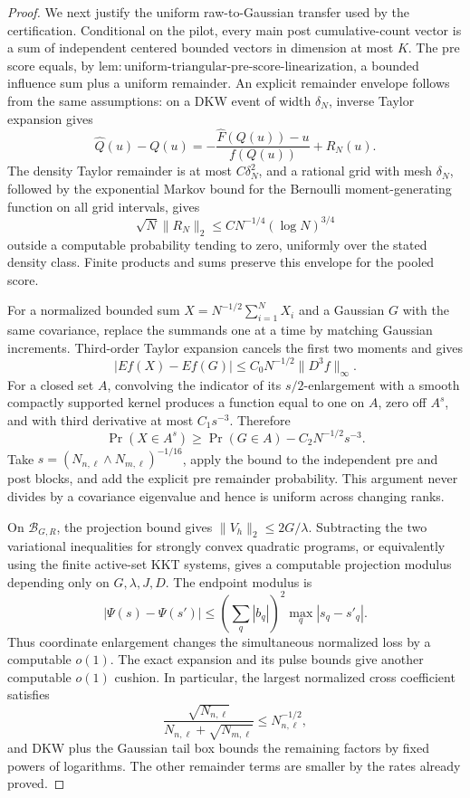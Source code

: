 \documentclass{article}
\begin{document}
\begin{proof}
We next justify the uniform raw-to-Gaussian transfer used by the certification.  Conditional on the pilot, every main post cumulative-count vector is a sum of independent centered bounded vectors in dimension at most \(K\).  The pre score equals, by
\(\mathrm{lem:uniform\mbox{-}triangular\mbox{-}pre\mbox{-}score\mbox{-}linearization}\), a bounded influence sum plus a uniform remainder.  An explicit remainder envelope follows from the same assumptions: on a DKW event of width \(\delta_N\), inverse Taylor expansion gives
\[
 \widehat Q(u)-Q(u)
 =-\frac{\widehat F(Q(u))-u}{f(Q(u))}+R_N(u).
\]
The density Taylor remainder is at most \(C\delta_N^2\), and a rational grid with mesh \(\delta_N\), followed by the exponential Markov bound for the Bernoulli moment-generating function on all grid intervals, gives
\[
 \sqrt N\|R_N\|_2
 \leq C N^{-1/4}(\log N)^{3/4}
\]
outside a computable probability tending to zero, uniformly over the stated density class.  Finite products and sums preserve this envelope for the pooled score.

For a normalized bounded sum \(X=N^{-1/2}\sum_{i=1}^NX_i\) and a Gaussian \(G\) with the same covariance, replace the summands one at a time by matching Gaussian increments.  Third-order Taylor expansion cancels the first two moments and gives
\[
 |Ef(X)-Ef(G)|\leq C_0N^{-1/2}\|D^3f\|_\infty.
\]
For a closed set \(A\), convolving the indicator of its \(s/2\)-enlargement with a smooth compactly supported kernel produces a function equal to one on \(A\), zero off \(A^s\), and with third derivative at most \(C_1s^{-3}\).  Therefore
\[
 \Pr(X\in A^s)\geq\Pr(G\in A)-C_2N^{-1/2}s^{-3}.
\]
Take \(s=(N_{n,\ell}\wedge N_{m,\ell})^{-1/16}\), apply the bound to the independent pre and post blocks, and add the explicit pre remainder probability.  This argument never divides by a covariance eigenvalue and hence is uniform across changing ranks.

On \(\mathcal B_{G,R}\), the projection bound gives \(\|V_h\|_2\leq2G/\lambda\).  Subtracting the two variational inequalities for strongly convex quadratic programs, or equivalently using the finite active-set KKT systems, gives a computable projection modulus depending only on \(G,\lambda,J,D\).  The endpoint modulus is
\[
 |\Psi(s)-\Psi(s')|
 \leq\left(\sum_q|b_q|\right)^2\max_q|s_q-s'_q|.
\]
Thus coordinate enlargement changes the simultaneous normalized loss by a computable \(o(1)\).  The exact expansion and its pulse bounds give another computable \(o(1)\) cushion.  In particular, the largest normalized cross coefficient satisfies
\[
 \frac{\sqrt{N_{n,\ell}}}{N_{n,\ell}+\sqrt{N_{m,\ell}}}
 \leq N_{n,\ell}^{-1/2},
\]
and DKW plus the Gaussian tail box bounds the remaining factors by fixed powers of logarithms.  The other remainder terms are smaller by the rates already proved.


\end{proof}
\end{document}
